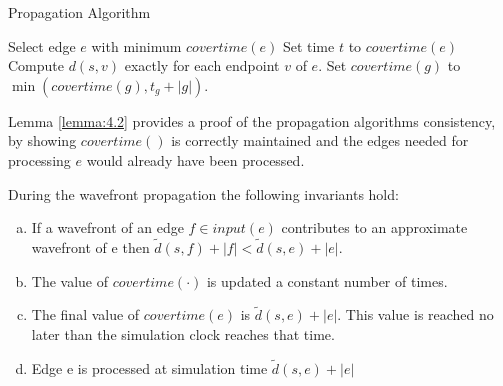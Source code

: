 \begin{algorithm}[H]
	\caption{Propagation Algorithm} \label{algorithm:propagationalgorithm}
	\begin{algorithmic}[1]
        	\State Select edge $e$ with minimum $covertime(e)$
            \State Set time $t$ to $covertime(e)$
            \State {}
            \State Compute $d(s,v)$ exactly for each endpoint $v$ of $e$.
           		\State {}
                \State Set $covertime(g)$ to $\min(covertime(g), t_g + |g|)$.
            \EndFor
        \EndWhile
	\end{algorithmic} 
\end{algorithm}

Lemma \ref{lemma:4.2} provides a proof of the propagation algorithms consistency, by showing 
$covertime()$ is correctly maintained and the edges needed for processing $e$ would already have 
been processed. 

\begin{Lemma}\label{lemma:4.2}
During the wavefront propagation the following invariants hold:

\begin{enumerate}[(a)]
	\item If a wavefront of an edge $f \in input(e)$ contributes to an
	approximate wavefront of e then $\tilde{d}(s,f)+|f|<\tilde{d}(s,e)+|e|$.
	\item The value of $covertime(\cdot)$ is updated a constant number of times.
	\item The final value of $covertime(e)$ is $\tilde{d}(s,e)+|e|$. This value
	is reached no later than the simulation clock reaches that time.
	\item Edge e is processed at simulation time $\tilde{d}(s,e) + |e|$
	\end{enumerate}
\end{Lemma}


